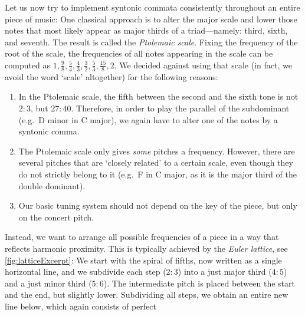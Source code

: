 \documentclass[british,11pt]{scrartcl}
\begin{document}
Let us now try to implement syntonic commata consistently throughout an entire
piece of music: One classical approach is to alter the major scale and lower
those notes that most likely appear as major thirds of a triad—namely: third,
sixth, and seventh. The result is called the \emph{Ptolemaic scale}.  Fixing the
frequency of the root of the scale, the frequencies of all notes appearing in
the scale can be computed as
$1,\frac98,\frac54,\frac43,\frac32,\frac53,\frac{15}8,2$. We decided against
using that scale (in fact, we avoid the word ‘scale’ altogether) for the following
reasons:
\begin{enumerate}
\item In the Ptolemaic scale, the fifth between the second and the sixth tone is
  not $2:3$, but $27:40$. Therefore, in order to play the parallel of the
  subdominant (e.g.\ D minor in C major), we again have to alter one of the
  notes by a syntonic comma.
\item The Ptolemaic scale only gives \emph{some} pitches a frequency. However,
  there are several pitches that are ‘closely related’ to a certain scale, even
  though they do not strictly belong to it (e.g.\ \sharp F in C major, as it
  is the major third of the double dominant).
\item Our basic tuning system should not depend on the key of the piece,
  but only on the concert pitch.
\end{enumerate}
Instead, we want to arrange all possible frequencies of a piece in a way that
reflects harmonic proximity. This is typically achieved by the \emph{Euler
  lattice}, see \cref{fig:latticeExcerpt}: We start with the spiral of fifths,
now written as a single horizontal line, and we subdivide each step ($2:3$) into
a just major third ($4:5$) and a just minor third ($5:6$). The intermediate
pitch is placed between the start and the end, but slightly lower. Subdividing
all steps, we obtain an entire new line below, which again consists of perfect
\end{document}
